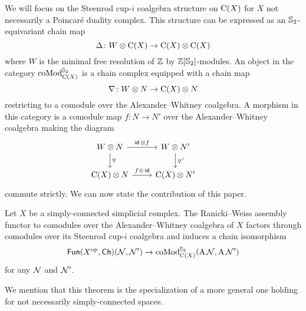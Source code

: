 We will focus on the Steenrod cup-$i$ coalgebra structure on $\operatorname{C}(X)$ for $X$ not necessarily a Poincar\'e duality complex.
This structure can be expressed as an $\mathbb{S}_2$-equivariant chain map
\[
\operatorname{\Delta} \colon W \otimes \operatorname{C}(X) \to \operatorname{C}(X) \otimes \operatorname{C}(X)
\]
where $W$ is the minimal free resolution of $\mathbb{Z}$ by $\mathbb{Z}[\mathbb{S}_2]$-modules.
An object in the category $\operatorname{coMod}_{\operatorname{C}(X)}^{\mathbb{S}_2}$ is a chain complex equipped with a chain map
\[
\nabla \colon W \otimes N \to \operatorname{C}(X) \otimes N
\]
restricting to a comodule over the Alexander--Whitney coalgebra.
A morphism in this category is a comodule map $f \colon N \to N'$ over the Alexander--Whitney coalgebra making the diagram
\[
\begin{tikzcd}
	W \ot N \arrow[d, "\triangledown"] \arrow[r, "\id\, \ot f"] &
	W \ot N' \arrow[d, "\triangledown'"] & \\
	\chains(X) \ot N \arrow[r, "f \ot\, \id"] &
	\chains(X) \ot N'
\end{tikzcd}
\]
commute strictly.
%
We can now state the contribution of this paper.

\begin{theorem*}
	Let $X$ be a simply-connected simplicial complex.
	The Ranicki--Weiss assembly functor to comodules over the Alexander--Whitney coalgebra of $X$ factors through comodules over its Steenrod cup-$i$ coalgebra and induces a chain isomorphism
	\[
	\mathsf{Fun}(X^{\mathrm{op}}, \mathsf{Ch})(\mathcal{N}, \mathcal{N}') \to \operatorname{coMod}^{\mathbb{S}_2}_{\operatorname{C}(X)}(\operatorname{A}\mathcal{N}, \operatorname{A}\mathcal{N}')
	\]
	for any $\mathcal{N}$ and $\mathcal{N}'$.
\end{theorem*}

We mention that this theorem is the specialization of a more general one holding for not necessarily simply-connected spaces.

